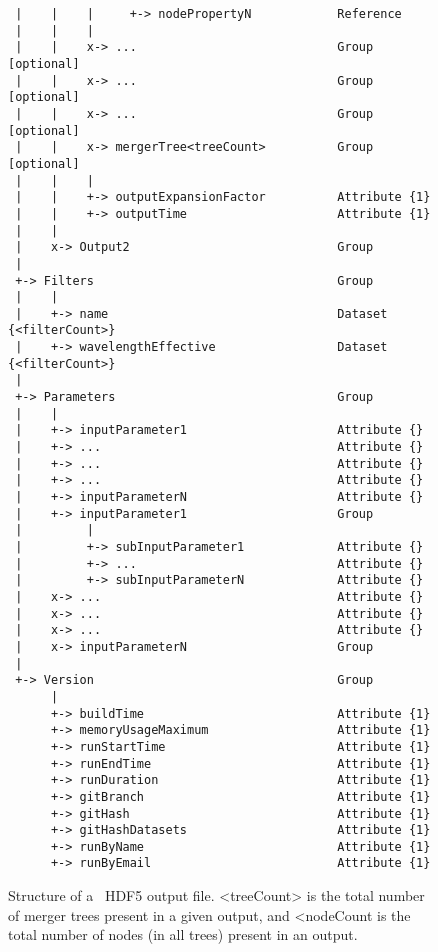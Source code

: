 \begin{figure}
\begin{center}
\begin{verbatim}
 |    |    |     +-> nodePropertyN            Reference
 |    |    |
 |    |    x-> ...                            Group              [optional]
 |    |    x-> ...                            Group              [optional]
 |    |    x-> ...                            Group              [optional]
 |    |    x-> mergerTree<treeCount>          Group              [optional]
 |    |    |
 |    |    +-> outputExpansionFactor          Attribute {1}
 |    |    +-> outputTime                     Attribute {1}
 |    |
 |    x-> Output2                             Group
 |
 +-> Filters                                  Group
 |    |
 |    +-> name                                Dataset   {<filterCount>}
 |    +-> wavelengthEffective                 Dataset   {<filterCount>}
 |
 +-> Parameters                               Group
 |    |
 |    +-> inputParameter1                     Attribute {}
 |    +-> ...                                 Attribute {}
 |    +-> ...                                 Attribute {}
 |    +-> ...                                 Attribute {}
 |    +-> inputParameterN                     Attribute {}
 |    +-> inputParameter1                     Group
 |         |
 |         +-> subInputParameter1             Attribute {}
 |         +-> ...                            Attribute {}
 |         +-> subInputParameterN             Attribute {}
 |    x-> ...                                 Attribute {}
 |    x-> ...                                 Attribute {}
 |    x-> ...                                 Attribute {}
 |    x-> inputParameterN                     Group
 |
 +-> Version                                  Group
      |
      +-> buildTime                           Attribute {1}
      +-> memoryUsageMaximum                  Attribute {1}
      +-> runStartTime                        Attribute {1}
      +-> runEndTime                          Attribute {1}
      +-> runDuration                         Attribute {1}
      +-> gitBranch                           Attribute {1}
      +-> gitHash                             Attribute {1}
      +-> gitHashDatasets                     Attribute {1}
      +-> runByName                           Attribute {1}
      +-> runByEmail                          Attribute {1}
\end{verbatim}
\end{center}
\caption{Structure of a \glc\ HDF5 output file. {\normalfont \ttfamily <treeCount>} is the total number of merger trees present in a given output, and {\normalfont \ttfamily <nodeCount} is the total number of nodes (in all trees) present in an output.}
\label{fig:glcOutputFileStructure}
\end{figure}

